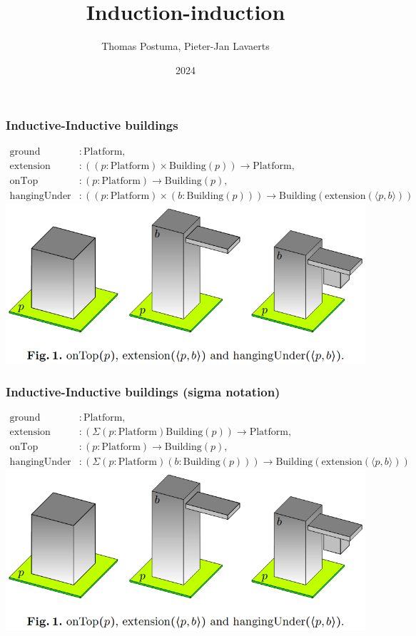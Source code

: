 \documentclass{beamer}
\title{Induction-induction}
\author{Thomas Postuma, Pieter-Jan Lavaerts}
\institute{Radboud University}
\date{2024}
\begin{document}
\frame{\titlepage}

\begin{frame}
    \frametitle{Inductive-Inductive buildings}
	{\footnotesize
	\begin{align*}
		\text{ground} &: \text{Platform},\\
		\text{extension} &: ((p : \text{Platform}) \times \text{Building}(p)) \rightarrow \text{Platform} ,\\
		\text{onTop} &: (p : \text{Platform}) \rightarrow \text{Building}(p) ,\\
		\text{hangingUnder} &: ((p : \text{Platform}) \times (b : \text{Building}(p))) \rightarrow \text{Building}(\text{extension}(\langle p, b \rangle))
	\end{align*}
	}%
	\includegraphics[width=\textwidth]{buildings}
\end{frame}

\begin{frame}
    \frametitle{Inductive-Inductive buildings (sigma notation)}
	{\footnotesize
	\begin{align*}
		\text{ground} &: \text{Platform},\\
		\text{extension} &: (\Sigma(p : \text{Platform}) \text{Building}(p)) \rightarrow \text{Platform} ,\\
		\text{onTop} &: (p : \text{Platform}) \rightarrow \text{Building}(p) ,\\
		\text{hangingUnder} &: (\Sigma(p : \text{Platform}) (b : \text{Building}(p))) \rightarrow \text{Building}(\text{extension}(\langle p, b \rangle))
	\end{align*}
	}%
	\includegraphics[width=\textwidth]{buildings}
\end{frame}
\end{document}
